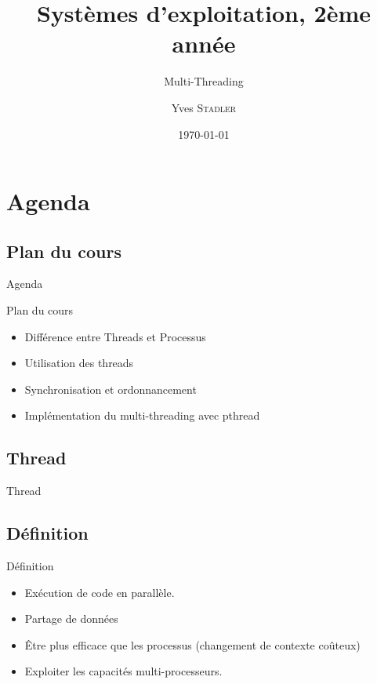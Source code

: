 
\title{Systèmes d'exploitation, 2ème année}
\subtitle{Multi-Threading}

\author{Yves \textsc{Stadler}}

\date{\today}



\begin{frame}
\titlepage
\end{frame}

\def\sectitle{Agenda}
\section{\sectitle}
\def\subsectitle{Plan du cours}
\subsection{\subsectitle}
\begin{frame}{\sectitle}
    \begin{block}{\subsectitle}
        \begin{itemize}
            \item Différence entre Threads et Processus
            \item Utilisation des threads
            \item Synchronisation et ordonnancement
            \item Implémentation du multi-threading avec pthread
        \end{itemize}
    \end{block}
\end{frame}


\def\sectitle{Thread}
\subsection{\sectitle}
\begin{frame}{\sectitle}
    \def\subsectitle{Définition}
    \subsection{\subsectitle}
    \begin{exampleblock}{\subsectitle}
        \begin{itemize}
            \item Exécution de code en parallèle.
            \item Partage de données
            \item Être plus efficace que les processus (changement de contexte
                coûteux)
            \item Exploiter les capacités multi-processeurs.
        \end{itemize}
    \end{exampleblock}
\end{frame}

